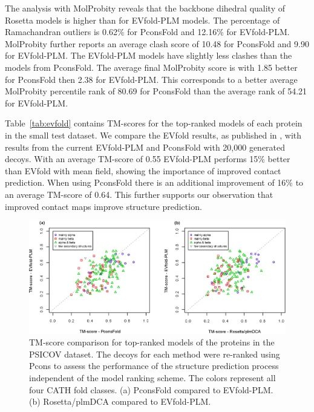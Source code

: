 \documentclass{bioinfo}
\begin{document}
The analysis with MolProbity reveals that the backbone dihedral
quality of Rosetta models is higher than for EVfold-PLM models. The
percentage of Ramachandran outliers is 0.62\% for PconsFold and
12.16\% for EVfold-PLM. MolProbity further reports an average clash
score of 10.48 for PconsFold and 9.90 for EVfold-PLM. The EVfold-PLM
models have slightly less clashes than the models from PconsFold. The
average final MolProbity score is with 1.85 better for PconsFold then
2.38 for EVfold-PLM. This corresponds to a better average MolProbity
percentile rank of 80.69 for PconsFold than the average rank of 54.21
for EVfold-PLM.


Table~\ref{tab:evfold} contains TM-scores for the top-ranked models of
each protein in the small test dataset. We compare the EVfold results,
as published in \citeauthor{marks_protein_2011}
\citeyear{marks_protein_2011}, with results from the current EVfold-PLM
and PconsFold with 20,000 generated decoys. With an average TM-score of 0.55
EVfold-PLM performs 15\% better than EVfold with mean field,
showing the importance of improved contact prediction. When using
PconsFold there is an additional improvement of 16\% to an average
TM-score of 0.64. This further supports our observation that improved
contact maps improve structure prediction.

\begin{figure}[!tpb]%
\centerline{\includegraphics[scale=0.7]{figures/vs.eps}}
\caption{TM-score comparison for top-ranked models of the proteins in
 the PSICOV dataset. The decoys for each method were re-ranked using
 Pcons to assess the performance of the structure prediction process
 independent of the model ranking scheme. The colors represent all
 four CATH fold classes. (a) PconsFold compared to EVfold-PLM. (b)
 Rosetta/plmDCA compared to EVfold-PLM.}\label{fig:vs}
\end{figure}
\end{document}
